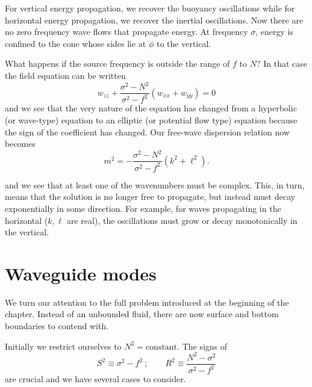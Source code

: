 For vertical energy propagation, we recover the buoyancy oscillations while for
horizontal energy propagation, we recover the inertial oscillations. Now there are no
zero frequency wave flows that propagate energy. At frequency $\sigma$, energy is confined to
the cone whose sides lie at $\phi$ to the vertical.

What happens if the source frequency is outside the range of $f$ to $N$? In that
case the field equation can be written
\[
	w_{zz}+\frac{\sigma^2-N^2}{\sigma^2-f^2}(w_{xx}+w_{yy})=0
\]
and we see that the very nature of the equation has changed from a hyperbolic (or
wave-type) equation to an elliptic (or potential flow type) equation because the sign of
the coefficient has changed. Our free-wave dispersion relation now becomes
\[
	m^2=-\frac{\sigma^2-N^2}{\sigma^2-f^2}(k^2+\ell^2).
\]


and we see that at least one of the wavenumbers must be complex. This, in turn,
means that the solution is no longer free to propagate, but instead must decay
exponentially in some direction. For example, for waves propagating in the horizontal
($k,\ell$ are real), the oscillations must grow or decay monotonically in the vertical.

\section{Waveguide modes}

We turn our attention to the full problem introduced at the beginning of the chapter.
Instead of an unbounded fluid, there are now surface and bottom boundaries to
contend with.


Initially we restrict ourselves to $N^2=\text{constant}$. The signs of
\[
	S^2\equiv\sigma^2-f^2\ ;\qquad
	R^2\equiv\frac{N^2-\sigma^2}{\sigma^2-f^2}
\]
are crucial and we have several cases to consider.

\sourcepagebreak


